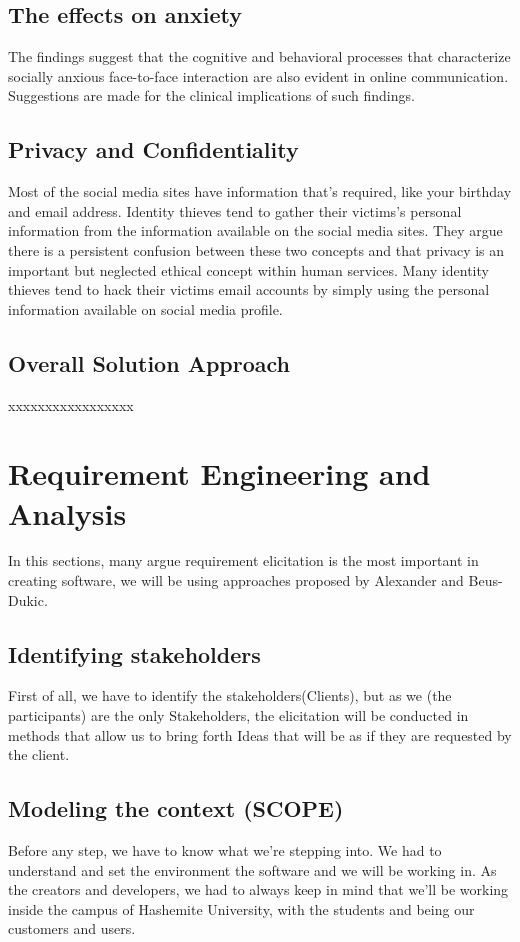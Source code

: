 \documentclass[12pt]{article}
\begin{document}
\subsection{The effects on anxiety}
The findings suggest that the cognitive and behavioral processes that characterize socially anxious face-to-face interaction are also evident in online communication. Suggestions are made for the clinical implications of such findings.\cite{firstone}
\subsection{Privacy and Confidentiality}
Most of the social media sites have information that's required, like your birthday and email address. Identity thieves tend to gather their victims’s personal information from the information available on the social media sites. They argue there is a persistent confusion between these two concepts and that privacy is an important but neglected ethical concept within human services. Many identity thieves tend to hack their victims email accounts by simply using the personal information available on social media profile.\cite{Confidentiality}
\subsection{Overall Solution Approach}
xxxxxxxxxxxxxxxxx
\section{ Requirement Engineering and Analysis}
In this sections, many argue requirement elicitation is the most important in creating software, we will be using approaches proposed by Alexander and Beus-Dukic. \cite{Alexander}

\subsection{Identifying stakeholders} 
First of all, we have to identify the stakeholders(Clients), but as we (the participants) are the only Stakeholders, the elicitation will be conducted in methods that allow us to bring forth Ideas that will be as if they are requested by the client.
\subsection{Modeling the context (SCOPE)}
Before any step, we have to know what we're stepping into.
We had to understand and set the environment the software and we will be working in. As the creators and developers, we had to always keep in mind that we'll be working inside the campus of Hashemite University, with the students and being our customers and users.
\end{document}
